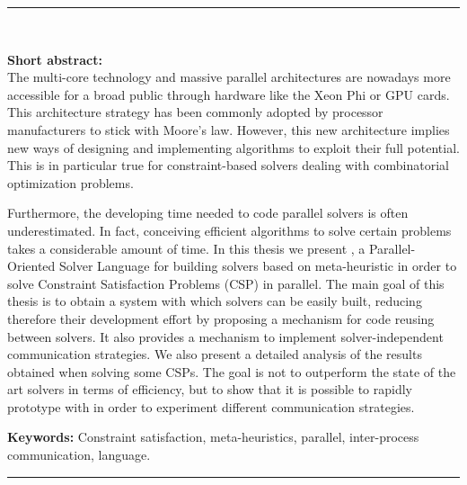 \cleardoublepage
\begin{vcentrepage}
\noindent\rule[2pt]{\textwidth}{0.8pt}\\
\begin{center}
{\Large\textbf{\titre}}
\end{center}
{\large\textbf{Short abstract:}\\}
The multi-core technology and massive parallel architectures are nowadays more accessible for a broad public through hardware like the Xeon Phi or GPU cards. This architecture strategy has been commonly adopted by processor manufacturers to stick with Moore's law. However, this new architecture implies new ways of designing and implementing algorithms to exploit their full potential. This is in particular true for constraint-based solvers dealing with combinatorial optimization problems.

Furthermore, the developing time needed to code parallel solvers is often underestimated. In fact, conceiving efficient algorithms to solve certain problems takes a considerable amount of time. In this thesis we present \posl{}, a Parallel-Oriented Solver Language for building solvers based on meta-heuristic in order to solve Constraint Satisfaction Problems (CSP) in parallel. The main goal of this thesis is to obtain a system with which solvers can be easily built, reducing therefore their development effort by proposing a mechanism for code reusing between solvers. It also provides a mechanism to implement solver-independent communication strategies. We also present a detailed analysis of the results obtained when solving some CSPs. The goal is not to outperform the state of the art solvers in terms of efficiency, but to show that it is possible to rapidly prototype with \posl{} in order to experiment different communication strategies.

{\large\textbf{Keywords:}}
Constraint satisfaction, meta-heuristics, parallel, inter-process communication, language.

\noindent\rule[2pt]{\textwidth}{0.8pt}
\end{vcentrepage}
